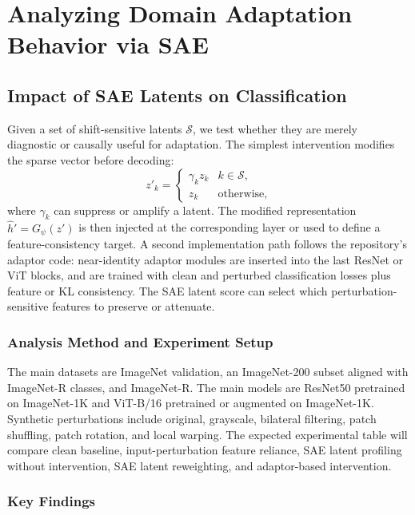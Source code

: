 \documentclass{article}
\begin{document}
\section{Analyzing Domain Adaptation Behavior via SAE}

\subsection{Impact of SAE Latents on Classification}

Given a set of shift-sensitive latents $\mathcal{S}$, we test whether they are merely diagnostic or causally useful for adaptation. The simplest intervention modifies the sparse vector before decoding:
\begin{equation}
z'_k =
\begin{cases}
\gamma_k z_k & k\in \mathcal{S},\\
z_k & \text{otherwise},
\end{cases}
\end{equation}
where $\gamma_k$ can suppress or amplify a latent. The modified representation $\hat{h}'=G_\psi(z')$ is then injected at the corresponding layer or used to define a feature-consistency target. A second implementation path follows the repository's adaptor code: near-identity adaptor modules are inserted into the last ResNet or ViT blocks, and are trained with clean and perturbed classification losses plus feature or KL consistency. The SAE latent score can select which perturbation-sensitive features to preserve or attenuate.

\subsubsection{Analysis Method and Experiment Setup}

The main datasets are ImageNet validation, an ImageNet-200 subset aligned with ImageNet-R classes, and ImageNet-R. The main models are ResNet50 pretrained on ImageNet-1K and ViT-B/16 pretrained or augmented on ImageNet-1K. Synthetic perturbations include original, grayscale, bilateral filtering, patch shuffling, patch rotation, and local warping. The expected experimental table will compare clean baseline, input-perturbation feature reliance, SAE latent profiling without intervention, SAE latent reweighting, and adaptor-based intervention.

\subsubsection{Key Findings}
\end{document}

